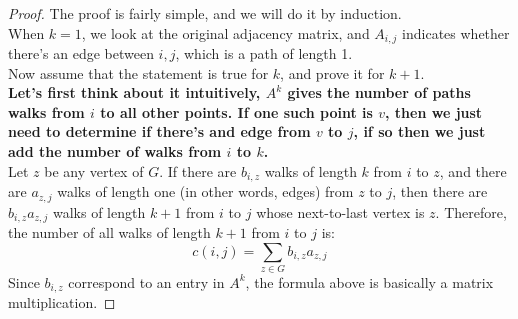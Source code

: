 \documentclass[12pt]{article}
\begin{document}
\begin{proof}
	The proof is fairly simple, and we will do it by induction.\\
	\newline
	When $k = 1$, we look at the original adjacency matrix, and $A_{i, j}$ indicates whether there's an edge between $i, j$, which is a path of length 1.\\
	\newline
	Now assume that the statement is true for $k$, and
	prove it for $k + 1$. \\
	\newline
	\textbf{Let's first think about it intuitively, $A^{k}$ gives the number of paths walks from $i$ to all other points. 
		If one such point is $v$, then we just need to determine if there's and edge from $v$ to $j$, 
		if so then we just add the number of walks from $i$ to  $k$.}\\
	\newline
	Let $z$ be any vertex of $G$. If there are $b_{i,z}$ walks of length $k$ from $i$ to $z$, and there are $a_{z,j}$ walks of length one (in other words, edges)
	from $z$ to $j$, then there are $b_{i,z}a_{z,j}$ walks of length $k + 1$ from $i$ to $j$ whose
	next-to-last vertex is $z$. Therefore, the number of all walks of length $k + 1$ from $i$ to $j$ is:
	$$
	c(i,j) = \sum_{z \in G} b_{i,z}a_{z,j}
	$$
	Since $b_{i, z}$ correspond to an entry in $A^k$, the formula above is basically a matrix multiplication. 
\end{proof}
\end{document}
